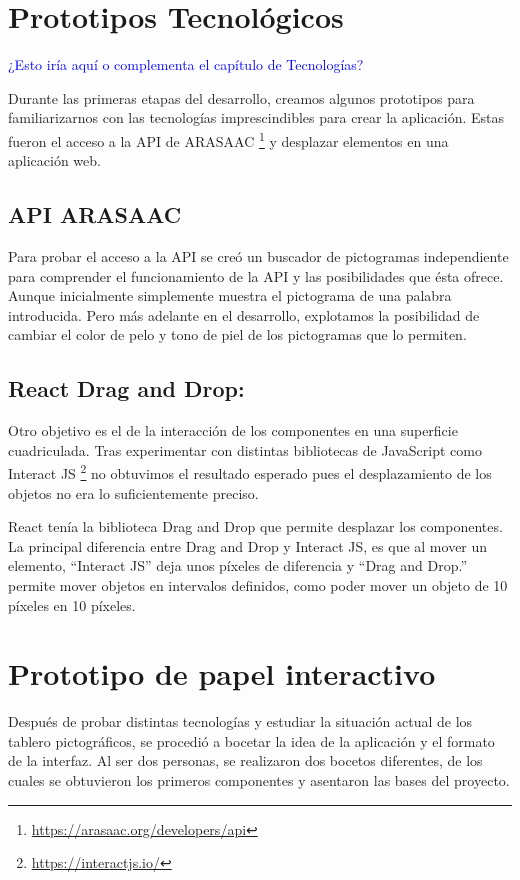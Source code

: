 \section{Prototipos Tecnológicos}
\textcolor{blue}{¿Esto iría aquí o complementa el capítulo de Tecnologías?}

Durante las primeras etapas del desarrollo, creamos algunos prototipos para familiarizarnos con las tecnologías imprescindibles para crear la aplicación. Estas fueron el acceso a la API de ARASAAC \footnote{\url{https://arasaac.org/developers/api}} y desplazar elementos en una aplicación web.

\subsection{API ARASAAC}

Para probar el acceso a la API se creó un buscador de pictogramas independiente para comprender el funcionamiento de la API y las posibilidades que ésta ofrece. Aunque inicialmente simplemente muestra el pictograma de una palabra introducida. Pero más adelante en el desarrollo, explotamos la posibilidad de cambiar el color de pelo y tono de piel de los pictogramas que lo permiten.


\subsection{React Drag and Drop:}

Otro objetivo es el de la interacción de los componentes en una superficie cuadriculada. Tras experimentar con distintas bibliotecas de JavaScript como Interact JS \footnote{\url{https://interactjs.io/}} no obtuvimos el resultado esperado pues el desplazamiento de los objetos no era lo suficientemente preciso.

React tenía la biblioteca Drag and Drop que permite desplazar los componentes. La principal diferencia entre Drag and Drop y Interact JS, es que al mover un elemento, “Interact JS”  deja unos píxeles de diferencia y “Drag and Drop.” permite mover objetos en intervalos definidos, como poder mover un objeto de 10 píxeles en 10 píxeles.


\section{Prototipo de papel interactivo}

Después de probar distintas tecnologías y estudiar la situación actual de los tablero pictográficos, se procedió a bocetar la idea de la aplicación y el formato de la interfaz. Al ser dos personas, se realizaron dos bocetos diferentes, de los cuales se obtuvieron los primeros componentes y asentaron las bases del proyecto.

